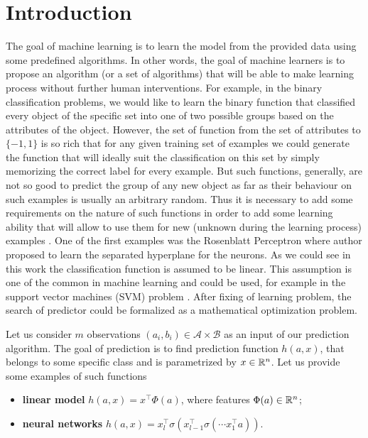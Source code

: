 \section{Introduction}\label{sec:basics_intro}
The goal of machine learning is to learn the model from the provided data using some predefined algorithms. In other words, the goal of machine learners is to propose an algorithm (or a set of algorithms) that will be able to make learning process without further human interventions. For example, in the binary classification problems, we would like to learn the binary function that classified every object of the specific set into one of two possible groups based on the attributes of the object. However, the set of function from the set of attributes to $\{-1,1\}$ is so rich that for any given training set of examples we could generate the function that will ideally suit the classification on this set by simply memorizing the correct label for every example. But such functions, generally, are not so good to predict the group of any new object as far as their behaviour on such examples is usually an arbitrary random. Thus it is necessary to add some requirements on the nature of such functions in order to add some learning ability that will allow to use them for new (unknown during the learning process) examples \cite{vapnik2013nature}. One of the first examples was the Rosenblatt Perceptron \cite{rosenblatt1960perceptron} where author proposed to learn the separated hyperplane for the neurons. As we could see in this work the classification function is assumed to be linear. This assumption is one of the common in machine learning and could be used, for example in the support vector machines (SVM) problem \cite{suykens1999least}. After fixing of learning problem, the search of predictor could be formalized as a mathematical optimization problem.


Let us consider $m$ observations $(a_i, b_i)\in\mathcal{A}\times\mathcal{B}$ as an input of our prediction algorithm. The goal of prediction is to find prediction function $h(a, x)$, that belongs to some specific class and is parametrized by $x\in\mathbb{R}^n$. Let us provide some examples of such functions
\begin{itemize}
    \item[] {\textbf{linear model}} $h(a,x) = x^\top \Phi(a)$, where features $\Phi(a)\in\mathbb{R}^n$;
    \item[] {\textbf{neural networks}} $h(a,x) = x_l^\top\sigma(x_{l-1}^\top\sigma(\cdots x_1^\top a))$.
\end{itemize}

